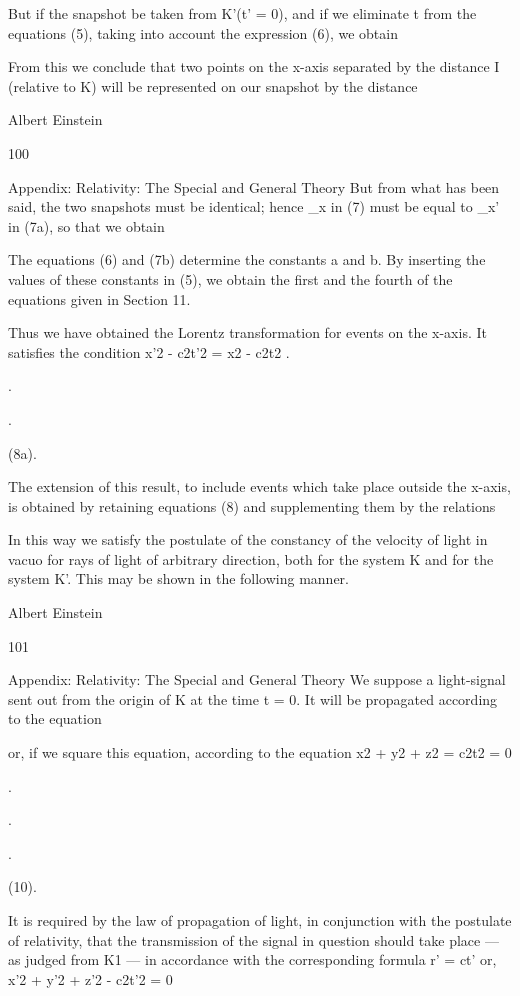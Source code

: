 \documentclass{article}
\begin{document}
But if the snapshot be taken from K'(t' = 0), and if we eliminate t from the equations (5),
taking into account the expression (6), we obtain

From this we conclude that two points on the x-axis separated by the distance I (relative
to K) will be represented on our snapshot by the distance

Albert Einstein

100

Appendix: Relativity: The Special and General Theory
But from what has been said, the two snapshots must be identical; hence \_x in (7) must
be equal to \_x' in (7a), so that we obtain

The equations (6) and (7b) determine the constants a and b. By inserting the values of
these constants in (5), we obtain the first and the fourth of the equations given in Section 11.

Thus we have obtained the Lorentz transformation for events on the x-axis. It satisfies the
condition
x'2 - c2t'2 = x2 - c2t2 .

.

.

(8a).

The extension of this result, to include events which take place outside the x-axis, is
obtained by retaining equations (8) and supplementing them by the relations

In this way we satisfy the postulate of the constancy of the velocity of light in vacuo for
rays of light of arbitrary direction, both for the system K and for the system K'. This may be
shown in the following manner.

Albert Einstein

101

Appendix: Relativity: The Special and General Theory
We suppose a light-signal sent out from the origin of K at the time t = 0. It will be
propagated according to the equation

or, if we square this equation, according to the equation
x2 + y2 + z2 = c2t2 = 0

.

.

.

(10).

It is required by the law of propagation of light, in conjunction with the postulate of
relativity, that the transmission of the signal in question should take place — as judged from
K1 — in accordance with the corresponding formula
r' = ct'
or,
x'2 + y'2 + z'2 - c2t'2 = 0
\end{document}
